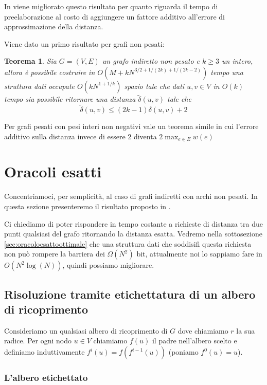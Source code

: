 \documentclass[a4paper,10pt]{amsbook}
\newcounter{counter1}
\theoremstyle{plain}
\newtheorem{myteo}[counter1]{Teorema}
\theoremstyle{definition}
\theoremstyle{remark}
\newcommand{\pa}[1]{\left(#1\right)}
\begin{document}
In \cite{appdistoraclplus} viene migliorato questo risultato per
quanto riguarda il tempo di preelaborazione al costo di aggiungere un
fattore additivo all'errore di approssimazione della distanza.

Viene dato un primo risultato per grafi non pesati:
\begin{myteo}
  Sia $G = (V,E)$ un grafo indiretto non pesato e $k\ge 3$ un intero,
  allora \`e possibile costruire in $O\pa{ M + kN^{3/2 + 1/(2k) +
      1/\pa{2k-2}}}$ tempo una struttura dati occupate
  $O\pa{kN^{1+1/k}}$ spazio tale che dati $u,v\in V$ in $O\pa{k}$
  tempo sia possibile ritornare una distanza $\tilde \delta\pa{u,v}$
  tale che
  \[ \tilde \delta \pa{ u,v} \le \pa{2k -1}\delta\pa{ u,v} + 2 \]
\end{myteo}

Per grafi pesati con pesi interi non negativi vale un teorema simile
in cui l'errore additivo sulla distanza invece di essere $2$ diventa
$2 \max _{e\in E} w(e)$

\section{Oracoli esatti}
\label{sec:oracoliesatti}

Concentriamoci, per semplicit\`a, al caso di grafi indiretti con archi
non pesati. In questa sezione presenteremo il risultato proposto in
\cite{compactdistance}.

Ci chiediamo di poter rispondere in tempo costante a richieste di
distanza tra due punti qualsiasi del grafo ritornando la distanza
esatta. Vedremo nella sottosezione \ref{sec:oracoloesattoottimale} che
una struttura dati che soddisifi questa richiesta non pu\`o rompere la
barriera dei $\Omega\pa{ N^2}$ bit, attualmente noi lo sappiamo fare
in $O\pa{N^2 \log\pa{ N}}$, quindi possiamo migliorare.


\subsection{Risoluzione tramite etichettatura di un albero di ricoprimento}

Consideriamo un qualsiasi albero di ricoprimento di $G$ dove chiamiamo
$r$ la sua radice. Per ogni nodo $u\in V$ chiamiamo $f(u)$ il padre
nell'albero scelto e definiamo induttivamente $f^i(u) =
f\pa{f^{i-1}(u)}$ (poniamo $f^0(u)=u$).

\subsubsection{L'albero etichettato}
\end{document}
